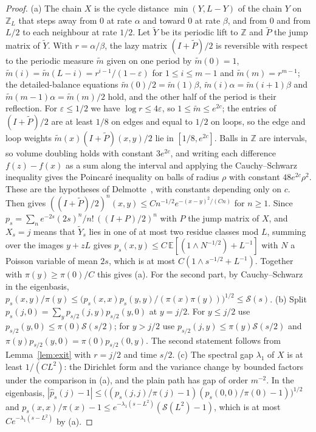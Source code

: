 \documentclass[11pt]{amsart}
\theoremstyle{remark}
\newcommand{\eps}{\varepsilon}
\newcommand{\E}{\mathbb{E}}
\newcommand{\Z}{\mathbb{Z}}
\begin{document}
\begin{proof}
(a) The chain $X$ is the cycle distance $\min(Y,L-Y)$ of the chain $Y$ on $\Z_L$ that steps away from $0$ at rate
$\alpha$ and toward $0$ at rate $\beta$, and from $0$ and from $L/2$ to each neighbour at rate $1/2$. Let $\tilde Y$
be its periodic lift to $\Z$ and $\tilde P$ the jump matrix of $\tilde Y$. With $r=\alpha/\beta$, the lazy matrix $(I+\tilde P)/2$ is
reversible with respect to the periodic measure $\tilde m$ given on one period by $\tilde m(0)=1$,
$\tilde m(i)=\tilde m(L-i)=r^{i-1}/(1-\eps)$ for $1\le i\le m-1$ and $\tilde m(m)=r^{m-1}$; the detailed-balance
equations $\tilde m(0)/2=\tilde m(1)\beta$, $\tilde m(i)\alpha=\tilde m(i+1)\beta$ and $\tilde m(m-1)\alpha=\tilde m(m)/2$
hold, and the other half of the period is their reflection. For $\eps\le1/2$ we have $\log r\le4\eps$,
so $1\le\tilde m\le e^{2c}$; the entries of $(I+\tilde P)/2$ are at least $1/8$ on edges and equal to $1/2$ on loops, so the
edge and loop weights $\tilde m(x)(I+\tilde P)(x,y)/2$ lie in $[1/8,e^{2c}]$. Balls in $\Z$ are intervals, so volume
doubling holds with constant $3e^{2c}$, and writing each difference $f(z)-f(x)$ as a sum along the interval and
applying the Cauchy--Schwarz inequality gives the Poincar\'e inequality on balls of radius $\rho$ with constant
$48e^{2c}\rho^2$. These are the hypotheses of Delmotte~\cite{Del99}, with constants depending only on $c$. Then \cite[Theorem~1.7]{Del99} gives
$((I+\tilde P)/2)^n(x,y)\le Cn^{-1/2}e^{-(x-y)^2/(Cn)}$ for $n\ge1$. Since
$p_s=\sum_ne^{-2s}(2s)^n/n!\,((I+P)/2)^n$ with $P$ the jump matrix of $X$, and $X_s=j$ means that $\tilde Y_s$ lies in
one of at most two residue classes mod $L$, summing over the images $y+zL$ gives $p_s(x,y)\le C\,\E[(1\wedge
N^{-1/2})+L^{-1}]$ with $N$ a Poisson variable of mean $2s$, which is at most $C(1\wedge s^{-1/2}+L^{-1})$. Together
with $\pi(y)\ge\pi(0)/C$ this gives (a). For the second part, by Cauchy--Schwarz in the eigenbasis,
$p_s(x,y)/\pi(y)\le\bigl(p_s(x,x)p_s(y,y)/(\pi(x)\pi(y))\bigr)^{1/2}\le\mathcal S(s)$.
(b) Split $p_s(j,0)=\sum_yp_{s/2}(j,y)p_{s/2}(y,0)$ at $y=j/2$. For $y\le j/2$ use $p_{s/2}(y,0)\le\pi(0)\mathcal
S(s/2)$; for $y>j/2$ use $p_{s/2}(j,y)\le\pi(y)\mathcal S(s/2)$ and $\pi(y)p_{s/2}(y,0)=\pi(0)p_{s/2}(0,y)$. The second
statement follows from Lemma~\ref{lem:exit} with $r=j/2$ and time $s/2$.
(c) The spectral gap $\lambda_1$ of $X$ is at least $1/(CL^2)$: the Dirichlet form and the variance change by
bounded factors under the comparison in (a), and the plain path has gap of order $m^{-2}$. In the eigenbasis,
$|\hat p_s(j)-1|\le\bigl((p_s(j,j)/\pi(j)-1)(p_s(0,0)/\pi(0)-1)\bigr)^{1/2}$ and
$p_s(x,x)/\pi(x)-1\le e^{-\lambda_1(s-L^2)}(\mathcal S(L^2)-1)$, which is at most $Ce^{-\lambda_1(s-L^2)}$ by (a).
\end{proof}
\end{document}
